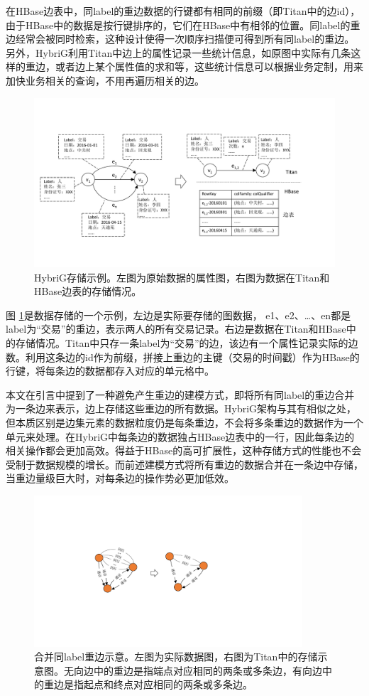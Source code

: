 在HBase边表中，同label的重边数据的行键都有相同的前缀（即Titan中的边id），由于HBase中的数据是按行键排序的，它们在HBase中有相邻的位置。同label的重边经常会被同时检索，这种设计使得一次顺序扫描便可得到所有同label的重边。另外，HybriG利用Titan中边上的属性记录一些统计信息，如原图中实际有几条这样的重边，或者边上某个属性值的求和等，这些统计信息可以根据业务定制，用来加快业务相关的查询，不用再遍历相关的边。

\begin{figure}[htbp]
\centering
\includegraphics[width=150mm]{fig/storage_layer.pdf}
\caption{HybriG存储示例。左图为原始数据的属性图，右图为数据在Titan和HBase边表的存储情况。}
\label{fig:storage_layer}
\end{figure}

图 \ref{fig:storage_layer}是数据存储的一个示例，左边是实际要存储的图数据， e1、e2、…、en都是label为“交易”的重边，表示两人的所有交易记录。右边是数据在Titan和HBase中的存储情况。Titan中只存一条label为“交易”的边，该边有一个属性记录实际的边数。利用这条边的id作为前缀，拼接上重边的主键（交易的时间戳）作为HBase的行键，将每条边的数据都存入对应的单元格中。

本文在引言中提到了一种避免产生重边的建模方式，即将所有同label的重边合并为一条边来表示，边上存储这些重边的所有数据。HybriG架构与其有相似之处，但本质区别是边集元素的数据粒度仍是每条重边，不会将多条重边的数据作为一个单元来处理。在HybriG中每条边的数据独占HBase边表中的一行，因此每条边的相关操作都会更加高效。得益于HBase的高可扩展性，这种存储方式的性能也不会受制于数据规模的增长。而前述建模方式将所有重边的数据合并在一条边中存储，当重边量级巨大时，对每条边的操作势必更加低效。

\begin{figure}[htbp]
\centering
\includegraphics[width=100mm]{fig/merge_edges.pdf}
\caption{合并同label重边示意。左图为实际数据图，右图为Titan中的存储示意图。无向边中的重边是指端点对应相同的两条或多条边，有向边中的重边是指起点和终点对应相同的两条或多条边。}
\label{fig:merge_edges}
\end{figure}

